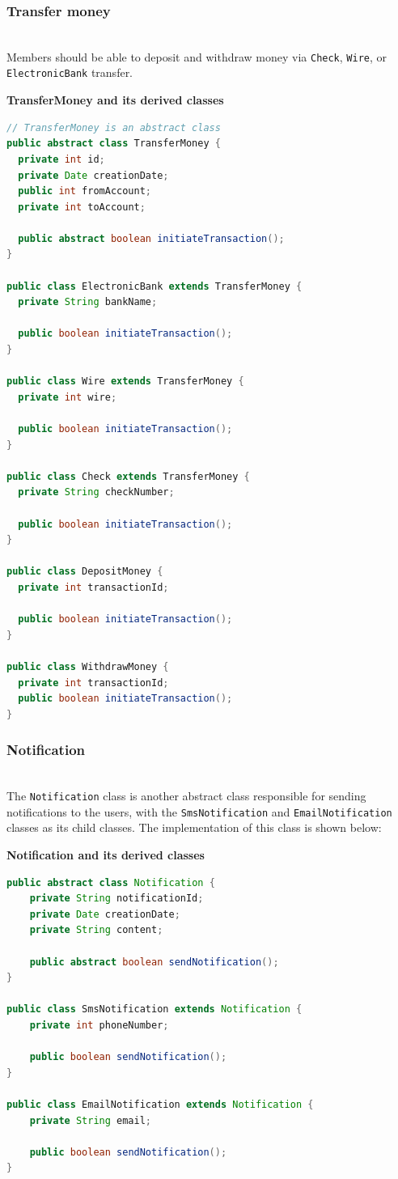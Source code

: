 \subsubsection{Transfer money}\label{ZqojUdCwYjrr2cT6ZJ70w}
\\
Members should be able to deposit and withdraw money via \texttt{Check}, \texttt{Wire}, or \texttt{ElectronicBank} transfer.

\textbf{TransferMoney and its derived classes}

\begin{lstlisting}[language=Java]
// TransferMoney is an abstract class
public abstract class TransferMoney {
  private int id;
  private Date creationDate;
  public int fromAccount;
  private int toAccount;

  public abstract boolean initiateTransaction();
}

public class ElectronicBank extends TransferMoney {
  private String bankName;
  
  public boolean initiateTransaction();
}

public class Wire extends TransferMoney {
  private int wire;

  public boolean initiateTransaction();
}

public class Check extends TransferMoney {
  private String checkNumber;

  public boolean initiateTransaction();
}

public class DepositMoney {
  private int transactionId;

  public boolean initiateTransaction();
}

public class WithdrawMoney {
  private int transactionId;
  public boolean initiateTransaction();
}
\end{lstlisting}

\subsubsection{Notification}\label{JbRss2Szx199OeoiK9EUr}
\\
The \texttt{Notification} class is another abstract class responsible for sending notifications to the users, with the \texttt{SmsNotification} and \texttt{EmailNotification} classes as its child classes. The implementation of this class is shown below:

\textbf{Notification and its derived classes}

\begin{lstlisting}[language=Java]
public abstract class Notification {
    private String notificationId;
    private Date creationDate;
    private String content;

    public abstract boolean sendNotification();
}

public class SmsNotification extends Notification {
    private int phoneNumber;

    public boolean sendNotification();
}

public class EmailNotification extends Notification {
    private String email;

    public boolean sendNotification();
}
\end{lstlisting}

